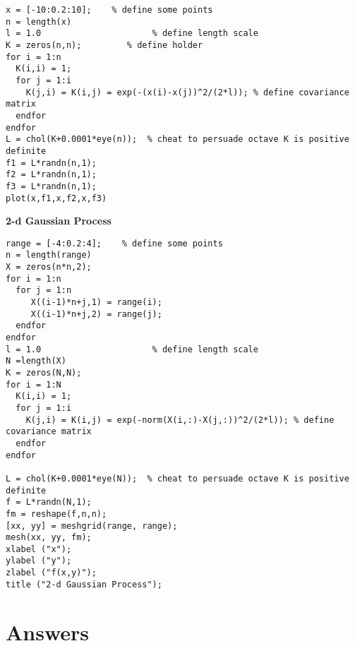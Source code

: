 \documentclass[11pt]{article}
\begin{document}
\begin{verbatim}
x = [-10:0.2:10];    % define some points
n = length(x)
l = 1.0                      % define length scale
K = zeros(n,n);         % define holder
for i = 1:n
  K(i,i) = 1;
  for j = 1:i
    K(j,i) = K(i,j) = exp(-(x(i)-x(j))^2/(2*l)); % define covariance matrix
  endfor
endfor
L = chol(K+0.0001*eye(n));  % cheat to persuade octave K is positive definite
f1 = L*randn(n,1);
f2 = L*randn(n,1);
f3 = L*randn(n,1);
plot(x,f1,x,f2,x,f3)
\end{verbatim}

\textbf{2-d Gaussian Process}

\begin{verbatim}
range = [-4:0.2:4];    % define some points
n = length(range)
X = zeros(n*n,2);
for i = 1:n
  for j = 1:n
     X((i-1)*n+j,1) = range(i);
     X((i-1)*n+j,2) = range(j);
  endfor
endfor
l = 1.0                      % define length scale
N =length(X)
K = zeros(N,N);  
for i = 1:N
  K(i,i) = 1;
  for j = 1:i
    K(j,i) = K(i,j) = exp(-norm(X(i,:)-X(j,:))^2/(2*l)); % define covariance matrix
  endfor
endfor

L = chol(K+0.0001*eye(N));  % cheat to persuade octave K is positive definite
f = L*randn(N,1);
fm = reshape(f,n,n);
[xx, yy] = meshgrid(range, range);
mesh(xx, yy, fm);
xlabel ("x");
ylabel ("y");
zlabel ("f(x,y)");
title ("2-d Gaussian Process");
\end{verbatim}



\section{Answers}
\label{sec:org2cffe50}
\end{document}
